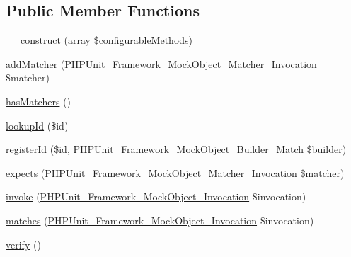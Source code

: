 \subsection*{Public Member Functions}
\begin{DoxyCompactItemize}
\item 
\mbox{\hyperlink{class_p_h_p_unit___framework___mock_object___invocation_mocker_ab20d70583bce1dc095fd863640fcad9d}{\+\_\+\+\_\+construct}} (array \$configurable\+Methods)
\item 
\mbox{\hyperlink{class_p_h_p_unit___framework___mock_object___invocation_mocker_aa69f965014eff38ff4c86a3e10a5420a}{add\+Matcher}} (\mbox{\hyperlink{interface_p_h_p_unit___framework___mock_object___matcher___invocation}{P\+H\+P\+Unit\+\_\+\+Framework\+\_\+\+Mock\+Object\+\_\+\+Matcher\+\_\+\+Invocation}} \$matcher)
\item 
\mbox{\hyperlink{class_p_h_p_unit___framework___mock_object___invocation_mocker_a81f246fc919f5043e206cc59f9bd3ed1}{has\+Matchers}} ()
\item 
\mbox{\hyperlink{class_p_h_p_unit___framework___mock_object___invocation_mocker_a1618f99693f7303270b2c569fdd602d4}{lookup\+Id}} (\$id)
\item 
\mbox{\hyperlink{class_p_h_p_unit___framework___mock_object___invocation_mocker_a538bdd6eae589613c28cf0da0243a4d4}{register\+Id}} (\$id, \mbox{\hyperlink{interface_p_h_p_unit___framework___mock_object___builder___match}{P\+H\+P\+Unit\+\_\+\+Framework\+\_\+\+Mock\+Object\+\_\+\+Builder\+\_\+\+Match}} \$builder)
\item 
\mbox{\hyperlink{class_p_h_p_unit___framework___mock_object___invocation_mocker_a1776bc980be5adac247b2a4ab1152128}{expects}} (\mbox{\hyperlink{interface_p_h_p_unit___framework___mock_object___matcher___invocation}{P\+H\+P\+Unit\+\_\+\+Framework\+\_\+\+Mock\+Object\+\_\+\+Matcher\+\_\+\+Invocation}} \$matcher)
\item 
\mbox{\hyperlink{class_p_h_p_unit___framework___mock_object___invocation_mocker_af2fc26e6704e08d95f2ea1d9c5ffb865}{invoke}} (\mbox{\hyperlink{interface_p_h_p_unit___framework___mock_object___invocation}{P\+H\+P\+Unit\+\_\+\+Framework\+\_\+\+Mock\+Object\+\_\+\+Invocation}} \$invocation)
\item 
\mbox{\hyperlink{class_p_h_p_unit___framework___mock_object___invocation_mocker_a4988c6fa11e275302172d0a4ae32dd3a}{matches}} (\mbox{\hyperlink{interface_p_h_p_unit___framework___mock_object___invocation}{P\+H\+P\+Unit\+\_\+\+Framework\+\_\+\+Mock\+Object\+\_\+\+Invocation}} \$invocation)
\item 
\mbox{\hyperlink{class_p_h_p_unit___framework___mock_object___invocation_mocker_aa33600b6a1b28d0c4dfe4d468272aaa4}{verify}} ()
\end{DoxyCompactItemize}
